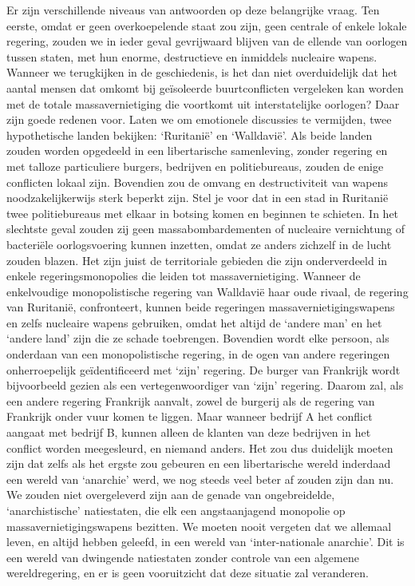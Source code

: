 \documentclass[
  a5paper,
  smalldemyvopaper,10pt,twoside,onecolumn,openright,extrafontsizes,hidelinks]{memoir}
\begin{document}
Er zijn verschillende niveaus van antwoorden op deze belangrijke vraag.
Ten eerste, omdat er geen overkoepelende staat zou zijn, geen centrale
of enkele lokale regering, zouden we in ieder geval gevrijwaard blijven
van de ellende van oorlogen tussen staten, met hun enorme, destructieve
en inmiddels nucleaire wapens. Wanneer we terugkijken in de
geschiedenis, is het dan niet overduidelijk dat het aantal mensen dat
omkomt bij geïsoleerde buurtconflicten vergeleken kan worden met de
totale massavernietiging die voortkomt uit interstatelijke oorlogen?
Daar zijn goede redenen voor. Laten we om emotionele discussies te
vermijden, twee hypothetische landen bekijken: `Ruritanië' en
`Walldavië'. Als beide landen zouden worden opgedeeld in een
libertarische samenleving, zonder regering en met talloze particuliere
burgers, bedrijven en politiebureaus, zouden de enige conflicten lokaal
zijn. Bovendien zou de omvang en destructiviteit van wapens
noodzakelijkerwijs sterk beperkt zijn. Stel je voor dat in een stad in
Ruritanië twee politiebureaus met elkaar in botsing komen en beginnen te
schieten. In het slechtste geval zouden zij geen massabombardementen of
nucleaire vernichtung of bacteriële oorlogsvoering kunnen inzetten,
omdat ze anders zichzelf in de lucht zouden blazen. Het zijn juist de
territoriale gebieden die zijn onderverdeeld in enkele
regeringsmonopolies die leiden tot massavernietiging. Wanneer de
enkelvoudige monopolistische regering van Walldavië haar oude rivaal, de
regering van Ruritanië, confronteert, kunnen beide regeringen
massavernietigingswapens en zelfs nucleaire wapens gebruiken, omdat het
altijd de `andere man' en het `andere land' zijn die ze schade
toebrengen. Bovendien wordt elke persoon, als onderdaan van een
monopolistische regering, in de ogen van andere regeringen
onherroepelijk geïdentificeerd met `zijn' regering. De burger van
Frankrijk wordt bijvoorbeeld gezien als een vertegenwoordiger van `zijn'
regering. Daarom zal, als een andere regering Frankrijk aanvalt, zowel
de burgerij als de regering van Frankrijk onder vuur komen te liggen.
Maar wanneer bedrijf A het conflict aangaat met bedrijf B, kunnen alleen
de klanten van deze bedrijven in het conflict worden meegesleurd, en
niemand anders. Het zou dus duidelijk moeten zijn dat zelfs als het
ergste zou gebeuren en een libertarische wereld inderdaad een wereld van
`anarchie' werd, we nog steeds veel beter af zouden zijn dan nu. We
zouden niet overgeleverd zijn aan de genade van ongebreidelde,
`anarchistische' natiestaten, die elk een angstaanjagend monopolie op
massavernietigingswapens bezitten. We moeten nooit vergeten dat we
allemaal leven, en altijd hebben geleefd, in een wereld van
`inter-nationale anarchie'. Dit is een wereld van dwingende natiestaten
zonder controle van een algemene wereldregering, en er is geen
vooruitzicht dat deze situatie zal veranderen.
\end{document}
